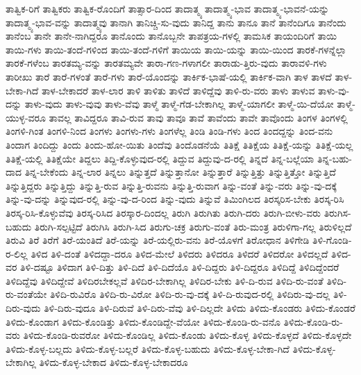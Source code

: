 {ತಾತ್ವಿಕ-ರಿಗೆ
ತಾತ್ವಿಕರು
ತಾತ್ವಿಕ-ರೊಂದಿಗೆ
ತಾತ್ಸಾರ-ದಿಂದ
ತಾದಾತ್ಮ್ಯ
ತಾದಾತ್ಮ್ಯ-ಭಾವ
ತಾದಾತ್ಮ್ಯ-ಭಾವನೆ-ಯನ್ನು
ತಾದಾತ್ಮ್ಯ-ಭಾವ-ವನ್ನು
ತಾದಾತ್ಮ್ಯವು
ತಾನಾಗಿ
ತಾನಿಚ್ಚಿ-ಸು-ವುದು
ತಾನಿದ್ದ
ತಾನು
ತಾನೂ
ತಾನೆ
ತಾನೆಂದಿಗೂ
ತಾನೆಂದು
ತಾನೆಂಬ
ತಾನೇ
ತಾನೇ-ನಾಗಿದ್ದರೂ
ತಾನೊಂದು
ತಾನೊಬ್ಬನೇ
ತಾಪತ್ರಯ-ಗಳಲ್ಲಿ
ತಾಮಸಿಕ
ತಾಯಂದಿರಿಗೆ
ತಾಯಿ
ತಾಯಿ-ಗಳು
ತಾಯಿ-ತಂದೆ-ಗಳಿಂದ
ತಾಯಿ-ತಂದೆ-ಗಳಿಗೆ
ತಾಯಿಯ
ತಾಯಿ-ಯನ್ನು
ತಾಯಿ-ಯಿಂದ
ತಾರಕೆ-ಗಳನ್ನೆಲ್ಲಾ
ತಾರಕೆ-ಗಳೆಂಬ
ತಾರತಮ್ಯ-ವನ್ನು
ತಾರತಮ್ಯವೇ
ತಾರಾ-ಗಣ-ಗಳಾಗಲೀ
ತಾರಾಡು-ತ್ತಿರು-ವುದು
ತಾರಾವಳಿ-ಗಳು
ತಾರೀಖು
ತಾರೆ
ತಾರೆ-ಗಳಂತೆ
ತಾರೆ-ಗಳು
ತಾರೆ-ಯೊಂದನ್ನು
ತಾರ್ಕಿಕ-ಭಾಷೆ-ಯಲ್ಲಿ
ತಾರ್ಕಿಕ-ವಾಗಿ
ತಾಳ
ತಾಳದೆ
ತಾಳ-ಬೇಕಾ-ಗಿದೆ
ತಾಳ-ಬೇಕಾದರೆ
ತಾಳ-ಲಾರ
ತಾಳಿ
ತಾಳಿತು
ತಾಳಿದೆ
ತಾಳಿದ್ದೆವು
ತಾಳಿ-ರು-ವರು
ತಾಳು
ತಾಳುವ
ತಾಳು-ವು-ದನ್ನು
ತಾಳು-ವುದು
ತಾಳು-ವುವು
ತಾಳು-ವೆವು
ತಾಳ್ಮೆ
ತಾಳ್ಮೆ-ಗೆಡ-ಬೇಕಾಗಿಲ್ಲ
ತಾಳ್ಮೆ-ಯಾಗಲೀ
ತಾಳ್ಮೆ-ಯಿ-ದೆಯೋ
ತಾಳ್ಮೆ-ಯುಳ್ಳ-ವರೂ
ತಾವಲ್ಲ
ತಾವಿದ್ದರೂ
ತಾವಿ-ರುವ
ತಾವು
ತಾವೂ
ತಾವೆ
ತಾವೆಂದು
ತಾವೇ
ತಾವೊಂದು
ತಿಂಗಳ
ತಿಂಗಳಲ್ಲಿ
ತಿಂಗಳಿ-ಗಿಂತ
ತಿಂಗಳಿ-ನಿಂದ
ತಿಂಗಳು
ತಿಂಗಳು-ಗಳು
ತಿಂಗಳೆಲ್ಲ
ತಿಂಡಿ
ತಿಂಡಿ-ಗಳು
ತಿಂದ
ತಿಂದದ್ದನ್ನು
ತಿಂದ-ವನು
ತಿಂದಾಗ
ತಿಂದಿದ್ದು
ತಿಂದು
ತಿಂದು-ಹೋ-ಯಿತು
ತಿಂದೆವು
ತಿಂದೊಡನೆಯೆ
ತಿತಿಕ್ಷೆ
ತಿತಿಕ್ಷೆಯ
ತಿತಿಕ್ಷೆ-ಯನ್ನು
ತಿತಿಕ್ಷೆ-ಯಲ್ಲ
ತಿತಿಕ್ಷೆ-ಯಲ್ಲಿ
ತಿತಿಕ್ಷೆಯೇ
ತಿದ್ದಲು
ತಿದ್ದಿ-ಕೊಳ್ಳುವುದ-ರಲ್ಲಿ
ತಿದ್ದುವ
ತಿದ್ದುವು-ದ-ರಲ್ಲಿ
ತಿನ್ನದೆ
ತಿನ್ನ-ಬಲ್ಲೆಯಾ
ತಿನ್ನ-ಬಹು-ದಾದ
ತಿನ್ನ-ಬೇಕೆಂದು
ತಿನ್ನ-ಲಾರ
ತಿನ್ನಲು
ತಿನ್ನುತ್ತದೆ
ತಿನ್ನುತ್ತಾನೋ
ತಿನ್ನುತ್ತಾರೆ
ತಿನ್ನುತ್ತಿತ್ತು
ತಿನ್ನುತ್ತಿತ್ತೋ
ತಿನ್ನುತ್ತಿದೆ
ತಿನ್ನುತ್ತಿದ್ದರು
ತಿನ್ನುತ್ತಿದ್ದು
ತಿನ್ನುತ್ತಿ-ರುವ
ತಿನ್ನುತ್ತಿ-ರುವನು
ತಿನ್ನುತ್ತಿ-ರುವಾಗ
ತಿನ್ನು-ವಂತೆ
ತಿನ್ನು-ವರು
ತಿನ್ನು-ವು-ದಕ್ಕೆ
ತಿನ್ನು-ವು-ದನ್ನು
ತಿನ್ನುವುದ-ರಲ್ಲಿ
ತಿನ್ನು-ವು-ದ-ರಿಂದ
ತಿನ್ನು-ವುದು
ತಿನ್ನುವೆ
ತಿಮಿಂಗಿಲದ
ತಿರಸ್ಕರಿಸ-ಬೇಕು
ತಿರಸ್ಕ-ರಿಸಿ
ತಿರಸ್ಕ-ರಿಸಿ-ಕೊಳ್ಳುವೆವು
ತಿರಸ್ಕ-ರಿಸಿದ
ತಿರಸ್ಕಾರ-ದಿಂದಲ್ಲ
ತಿರುಗಿ
ತಿರುಗಿತು
ತಿರುಗಿ-ದರು
ತಿರುಗಿ-ಬೀಳು-ವರು
ತಿರುಗಿಸ-ಬಹುದು
ತಿರುಗಿ-ಸಲ್ಪಟ್ಟಿದೆ
ತಿರುಗಿಸಿ
ತಿರುಗಿ-ಸಿದ
ತಿರುಗು-ಚಕ್ರ
ತಿರುಗು-ವಂತೆ
ತಿರು-ಮಂತ್ರ
ತಿರುಳಿಗಾ-ಗಲ್ಲ
ತಿರುಳಿಲ್ಲದೆ
ತಿರುವಿ
ತಿರೆ
ತಿರೆಗೆ
ತಿರೆ-ಯಂತಿದೆ
ತಿರೆ-ಯನ್ನು
ತಿರೆ-ಯಲ್ಲಿರು-ವನು
ತಿರೆ-ಯೊಳಗೆ
ತಿರೋಧಾನ
ತಿಳಿಗೇಡಿ
ತಿಳಿ-ಗೊಂಡಿ-ರ-ಲಿಲ್ಲ
ತಿಳಿದ
ತಿಳಿ-ದಂತೆ
ತಿಳಿದದ್ದಾ-ದರೂ
ತಿಳಿದ-ಮೇಲೆ
ತಿಳಿದರು
ತಿಳಿದರೂ
ತಿಳಿದರೆ
ತಿಳಿದರೋ
ತಿಳಿದಲ್ಲದೆ
ತಿಳಿದ-ವರ
ತಿಳಿ-ದಷ್ಟೂ
ತಿಳಿದಾಗ
ತಿಳಿ-ದಿತ್ತು
ತಿಳಿ-ದಿದೆ
ತಿಳಿ-ದಿದೆಯೊ
ತಿಳಿ-ದಿದ್ದರು
ತಿಳಿ-ದಿದ್ದರೂ
ತಿಳಿದಿದ್ದೆ
ತಿಳಿದಿದ್ದೆಂದರೆ
ತಿಳಿದಿದ್ದೆವು
ತಿಳಿದಿದ್ದೇವೆ
ತಿಳಿದಿರಬೇಕಲ್ಲವೆ
ತಿಳಿದಿರ-ಬೇಕಾಗಿಲ್ಲ
ತಿಳಿದಿರ-ಬೇಕು
ತಿಳಿ-ದಿ-ರುವ
ತಿಳಿದಿ-ರು-ವಂತೆ
ತಿಳಿದಿ-ರು-ವಂತೆಯೇ
ತಿಳಿದಿ-ರುವಿರೊ
ತಿಳಿದಿ-ರು-ವಿರೋ
ತಿಳಿದಿ-ರು-ವು-ದಕ್ಕೆ
ತಿಳಿ-ದಿ-ರುವುದ-ರಲ್ಲಿ
ತಿಳಿದಿರು-ವು-ದಲ್ಲ
ತಿಳಿ-ದಿರು-ವುದು
ತಿಳಿ-ದಿರು-ವುದೂ
ತಿಳಿ-ದಿರುವೆ
ತಿಳಿ-ದಿರು-ವೆವು
ತಿಳಿ-ದಿಲ್ಲದೇ
ತಿಳಿದು
ತಿಳಿದು-ಕೊಂಡರು
ತಿಳಿದು-ಕೊಂಡರೆ
ತಿಳಿದು-ಕೊಂಡಾಗ
ತಿಳಿದು-ಕೊಂಡಿತ್ತು
ತಿಳಿದು-ಕೊಂಡಿದ್ದೇ-ವೆಯೋ
ತಿಳಿದು-ಕೊಂಡಿ-ರು-ವನೊ
ತಿಳಿದು-ಕೊಂಡಿ-ರು-ವರು
ತಿಳಿದು-ಕೊಂಡಿ-ರುವರೋ
ತಿಳಿದು-ಕೊಂಡಿಲ್ಲ
ತಿಳಿದು-ಕೊಂಡು
ತಿಳಿದು-ಕೊಳ್ಳ
ತಿಳಿದು-ಕೊಳ್ಳದೆ
ತಿಳಿದು-ಕೊಳ್ಳದೇ
ತಿಳಿದು-ಕೊಳ್ಳ-ಬಲ್ಲದು
ತಿಳಿದು-ಕೊಳ್ಳ-ಬಲ್ಲರೆ
ತಿಳಿದು-ಕೊಳ್ಳ-ಬಹುದು
ತಿಳಿದು-ಕೊಳ್ಳ-ಬೇಕಾ-ಗಿದೆ
ತಿಳಿದು-ಕೊಳ್ಳ-ಬೇಕಾಗಿಲ್ಲ
ತಿಳಿದು-ಕೊಳ್ಳ-ಬೇಕಾದ
ತಿಳಿದು-ಕೊಳ್ಳ-ಬೇಕಾದರೂ
}
